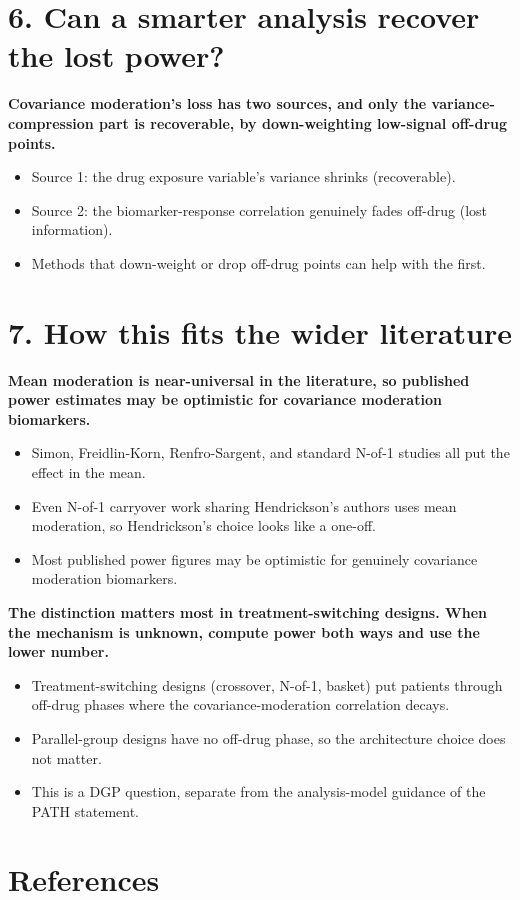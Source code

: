 \documentclass[
  11pt,
]{article}
\begin{document}
\section{6. Can a smarter analysis recover the lost power?}

\textbf{Covariance moderation's loss has two sources, and only
the variance-compression part is recoverable, by down-weighting
low-signal off-drug points.}

\begin{itemize}\setlength{\itemsep}{2pt}\setlength{\parskip}{0pt}
\item Source 1: the drug exposure variable's variance shrinks
(recoverable).
\item Source 2: the biomarker-response correlation genuinely fades
off-drug (lost information).
\item Methods that down-weight or drop off-drug points can help with
the first.
\end{itemize}

\section{7. How this fits the wider literature}

\textbf{Mean moderation is near-universal in the literature, so
published power estimates may be optimistic for covariance moderation
biomarkers.}

\begin{itemize}\setlength{\itemsep}{2pt}\setlength{\parskip}{0pt}
\item Simon, Freidlin-Korn, Renfro-Sargent, and standard N-of-1
studies all put the effect in the mean.
\item Even N-of-1 carryover work sharing Hendrickson's authors uses
mean moderation, so Hendrickson's choice looks like a one-off.
\item Most published power figures may be optimistic for genuinely
covariance moderation biomarkers.
\end{itemize}

\textbf{The distinction matters most in treatment-switching
designs. When the mechanism is unknown, compute power both ways
and use the lower number.}

\begin{itemize}\setlength{\itemsep}{2pt}\setlength{\parskip}{0pt}
\item Treatment-switching designs (crossover, N-of-1, basket) put
patients through off-drug phases where the covariance-moderation correlation decays.
\item Parallel-group designs have no off-drug phase, so the
architecture choice does not matter.
\item This is a DGP question, separate from the analysis-model
guidance of the PATH statement.
\end{itemize}

\section{References}\label{references}

\protect{}\label{refs}
\end{document}
